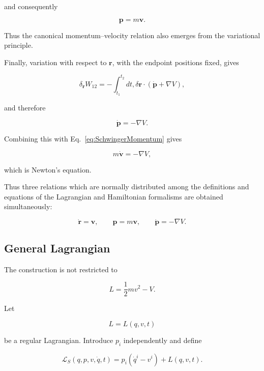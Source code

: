and consequently

\begin{equation}
\boxed{\mathbf p=m\mathbf v}.
\label{eq:SchwingerMomentum}
\end{equation}

Thus the canonical momentum--velocity relation also emerges from the variational principle.

Finally, variation with respect to \(\mathbf r\), with the endpoint positions fixed, gives

\begin{equation}
\delta_{\mathbf r}W_{12}=
-\int_{t_1}^{t_2}
dt,
\delta\mathbf r\cdot
\left(
\dot{\mathbf p}+\nabla V
\right),
\end{equation}

and therefore

\begin{equation}
\boxed{
\dot{\mathbf p}=-\nabla V
}.
\label{eq:SchwingerNewton}
\end{equation}

Combining this with Eq.~\eqref{eq:SchwingerMomentum} gives

\begin{equation}
m\dot{\mathbf v}=
-\nabla V,
\end{equation}

which is Newton's equation.

Thus three relations which are normally distributed among the definitions and equations of the Lagrangian and Hamiltonian formalisms are obtained simultaneously:

\begin{equation}
\boxed{
\dot{\mathbf r}=\mathbf v,
\qquad
\mathbf p=m\mathbf v,
\qquad
\dot{\mathbf p}=-\nabla V.
}
\end{equation}

\subsection{General Lagrangian}

The construction is not restricted to

$$
L=\frac12m v^2-V.
$$

Let

\begin{equation}
L=L(q,v,t)
\end{equation}

be a regular Lagrangian. Introduce \(p_i\) independently and define

\begin{equation}
\mathcal L_S(q,p,v,\dot q,t)=
p_i(\dot q^i-v^i)+L(q,v,t).
\label{eq:GeneralSchwingerL}
\end{equation}

